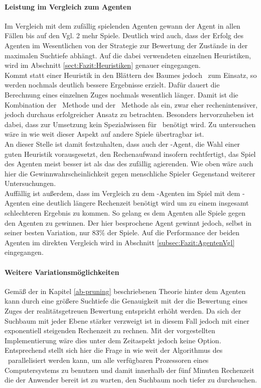\paragraph{Leistung im Vergleich zum Agenten }
Im Vergleich mit dem zufällig spielenden Agenten gewann der Agent \mxZitat{\abp} in allen Fällen bis auf den Vgl. 2 mehr Spiele. Deutlich wird auch, dass der Erfolg des Agenten im Wesentlichen von der Strategie zur Bewertung der Zustände in der maximalen Suchtiefe abhängt. Auf die dabei verwendeten einzelnen Heuristiken, wird im Abschnitt \ref{sect:Fazit:Heuristiken} genauer eingegangen.
\\Kommt statt einer Heuristik in den Blättern des Baumes jedoch \mc\ zum Einsatz, so werden nochmals deutlich bessere Ergebnisse erzielt. Dafür dauert die Berechnung eines einzelnen Zuges nochmals wesentlich länger. Damit ist die Kombination der \ababs\ Methode und der \mc\ Methode als ein, zwar eher rechenintensiver, jedoch durchaus erfolgreicher Ansatz zu betrachten. Besonders hervorzuheben ist dabei, dass zur Umsetzung kein Spezialwissen für \ot\ benötigt wird. Zu untersuchen wäre in wie weit dieser Aspekt auf andere Spiele übertragbar ist.
\\An dieser Stelle ist damit festzuhalten, dass auch der \mxZitat{\abp}-Agent, die Wahl einer guten Heuristik vorausgesetzt, den Rechenaufwand insofern rechtfertigt, das Spiel des Agenten meist besser ist als das des zufällig agierenden. Wie oben wäre auch hier die Gewinnwahrscheinlichkeit gegen menschliche Spieler Gegenstand weiterer Untersuchungen.
\\Auffällig ist außerdem, dass im Vergleich zu dem \mxZitat{\mc}-Agenten im Spiel mit dem -Agenten eine deutlich längere Rechenzeit benötigt wird um zu einem insgesamt schlechteren Ergebnis zu kommen. So gelang es dem Agenten \mxZitat{\mc} alle Spiele gegen den Agenten  zu gewinnen. Der hier besprochene Agent gewinnt jedoch, selbst in seiner besten Variation, nur $83\%$ der Spiele. Auf die Performance der beiden Agenten im direkten Vergleich wird in Abschnitt \ref{subsec:Fazit:AgentenVgl} eingegangen.
\paragraph{Weitere Variationsmöglichkeiten}
Gemäß der in Kapitel \ref{ab-pruning} beschriebenen Theorie hinter dem Agenten \mxZitat{\abp} kann durch eine größere Suchtiefe  die Genauigkeit mit der die Bewertung eines Zuges der realitätsgetreuen Bewertung entspricht erhöht werden. Da sich der Suchbaum mit jeder Ebene stärker verzweigt ist in diesem Fall jedoch mit einer exponentiell steigenden Rechenzeit zu rechnen. Mit der vorgestellten Implementierung wäre dies unter dem Zeitaspekt jedoch keine Option. Entsprechend stellt sich hier die Frage in wie weit der Algorithmus des \ababs\ parallelisiert werden kann, um alle verfügbaren Prozessoren eines Computersystems zu benutzen und damit innerhalb der fünf Minuten Rechenzeit die der Anwender bereit ist zu warten, den Suchbaum noch tiefer zu durchsuchen.


